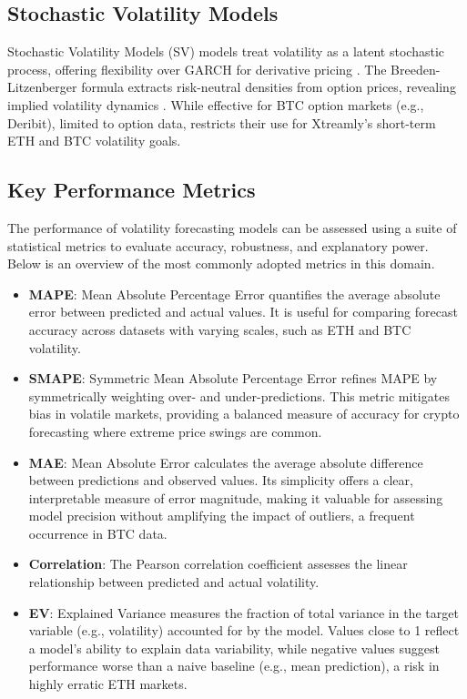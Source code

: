 \documentclass[9pt]{article}
\begin{document}
\begin{multicols}{2}
		\subsection{Stochastic Volatility Models}
		Stochastic Volatility Models (SV) models treat volatility as a latent stochastic process, offering flexibility over GARCH for derivative pricing \citep{gatheral2011}. The Breeden-Litzenberger formula extracts risk-neutral densities from option prices, revealing implied volatility dynamics \citep{breeden1978}. While effective for BTC option markets (e.g., Deribit), limited to option data, restricts their use for Xtreamly’s short-term ETH and BTC volatility goals.
		
		\subsection{Key Performance Metrics}
		The performance of volatility forecasting models can be assessed using a suite of statistical metrics to evaluate accuracy, robustness, and explanatory power. Below is an overview of the most commonly adopted metrics in this domain.
		
		\begin{itemize}
			\item \textbf{MAPE}: Mean Absolute Percentage Error quantifies the average absolute error between predicted and actual values. It is useful for comparing forecast accuracy across datasets with varying scales, such as ETH and BTC volatility.
			
			\item \textbf{SMAPE}: Symmetric Mean Absolute Percentage Error refines MAPE by symmetrically weighting over- and under-predictions. This metric mitigates bias in volatile markets, providing a balanced measure of accuracy for crypto forecasting where extreme price swings are common.
			
			\item \textbf{MAE}: Mean Absolute Error calculates the average absolute difference between predictions and observed values. Its simplicity offers a clear, interpretable measure of error magnitude, making it valuable for assessing model precision without amplifying the impact of outliers, a frequent occurrence in BTC data.
			
			\item \textbf{Correlation}: The Pearson correlation coefficient assesses the linear relationship between predicted and actual volatility.
			
			\item \textbf{EV}: Explained Variance measures the fraction of total variance in the target variable (e.g., volatility) accounted for by the model. Values close to 1 reflect a model’s ability to explain data variability, while negative values suggest performance worse than a naive baseline (e.g., mean prediction), a risk in highly erratic ETH markets.
			

\end{itemize}
\end{multicols}
\end{document}
